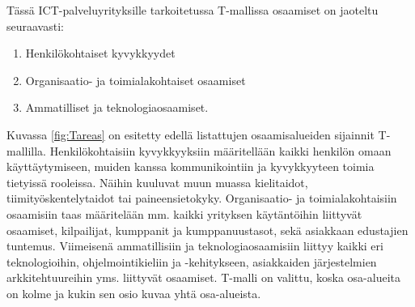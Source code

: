 \documentclass[a4paper,finnish,12pt]{article}
\begin{document}
Tässä ICT-palveluyrityksille tarkoitetussa T-mallissa osaamiset on jaoteltu seuraavasti: \begin{enumerate}
	\item Henkilökohtaiset kyvykkyydet
	\item Organisaatio- ja toimialakohtaiset osaamiset
	\item Ammatilliset ja teknologiaosaamiset.
\end{enumerate} Kuvassa \ref{fig:Tareas} on esitetty edellä listattujen osaamisalueiden sijainnit T-mallilla. Henkilökohtaisiin kyvykkyyksiin määritellään kaikki henkilön omaan käyttäytymiseen, muiden kanssa kommunikointiin ja kyvykkyyteen toimia tietyissä rooleissa. Näihin kuuluvat muun muassa kielitaidot, tiimityöskentelytaidot tai paineensietokyky. Organisaatio- ja toimialakohtaisiin osaamisiin taas määritelään mm. kaikki yrityksen käytäntöihin liittyvät osaamiset, kilpailijat, kumppanit ja kumppanuustasot, sekä asiakkaan edustajien tuntemus. Viimeisenä ammatillisiin ja teknologiaosaamisiin liittyy kaikki eri teknologioihin, ohjelmointikieliin ja -kehitykseen, asiakkaiden järjestelmien arkkitehtuureihin yms. liittyvät osaamiset. T-malli on valittu, koska osa-alueita on kolme ja kukin sen osio kuvaa yhtä osa-alueista.
\end{document}
